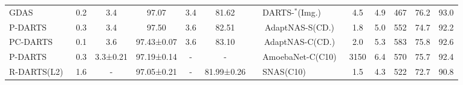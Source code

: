 \documentclass[10pt,twocolumn,letterpaper]{article}
\begin{document}
\begin{table*}[t]
\begin{center}
{\begin{tabular}{lcccccllccccc}
GDAS~\cite{GDAS}                    & 0.2                                                                   & 3.4          & 97.07         & 3.4           & 81.62         &  & DARTS-$^\ast$(Img.)~\cite{darts-}                        & 4.5                                                                   & 4.9                                                                   & 467                                                                  & 76.2                                                                 & 93.0                                                                 \\ \cline{8-13} 
P-DARTS~\cite{pdarts}                 & 0.3                                                                   & 3.4          & 97.50         & 3.6           & 82.51         &  & \multicolumn{1}{c}{AdaptNAS-S(CD.)~\cite{adaptNAS}} & 1.8                                                                   & 5.0                                                                   & 552                                                                  & 74.7                                                                 & 92.2                                                                 \\
PC-DARTS~\cite{pc-darts}                & 0.1                                                                   & 3.6          & 97.43±0.07    & 3.6           & 83.10         &  & \multicolumn{1}{c}{AdaptNAS-C(CD.)~\cite{adaptNAS}} & 2.0                                                                   & 5.3                                                                   & 583                                                                  & 75.8                                                                 & 92.6                                                                 \\ \cline{1-6} \cline{8-13} 
P-DARTS~\cite{pdarts}                 & 0.3                                                                   & 3.3±0.21     & 97.19±0.14    & -             & -             &  & AmoebaNet-C(C10)~\cite{amoebanet}                    & 3150                                                                  & 6.4                                                                   & 570                                                                  & 75.7                                                                 & 92.4                                                                 \\
R-DARTS(L2)~\cite{rdarts}             & 1.6                                                                   & -            & 97.05±0.21    & -             & 81.99±0.26    &  & SNAS(C10)~\cite{snas}                           & 1.5                                                                   & 4.3                                                                   & 522                                                                  & 72.7                                                                 & 90.8                                                                 \\

\end{tabular}}
\end{center}
\end{table*}
\end{document}

